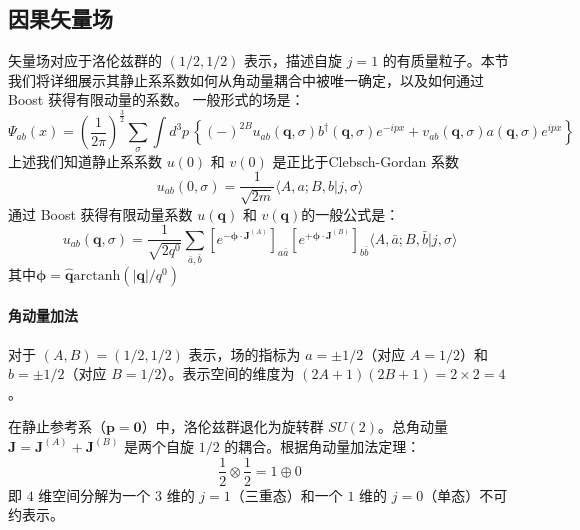 \subsection{因果矢量场 }
矢量场对应于洛伦兹群的 $(1/2,1/2)$ 表示，描述自旋 $j=1$ 的有质量粒子。本节我们将详细展示其静止系系数如何从角动量耦合中被唯一确定，以及如何通过 Boost 获得有限动量的系数。
一般形式的场是：
\begin{equation}
    \Psi_{ab}(x) =(\frac{1}{2\pi})^\frac{3}{2}\sum_{\sigma}\int d^3p \, \left\{(-)^{2B} u_{ab}(\boldsymbol{q},\sigma)b^\dagger(\boldsymbol{q},\sigma) e^{-ipx} + v_{ab}(\boldsymbol{q},\sigma) a(\boldsymbol{q},\sigma)e^{ipx} \right\}
\end{equation}
上述我们知道静止系系数 $u(0)$ 和 $v(0)$ 是正比于Clebsch-Gordan  系数 
\begin{equation}
    u_{ab}(0, \sigma) = \frac{1}{\sqrt{2m}} \langle A, a; B, b | j, \sigma \rangle
    \label{eq:u0_general_1/2}
\end{equation}
通过 Boost 获得有限动量系数 $u(\boldsymbol{q})$ 和 $v(\boldsymbol{q})$的一般公式是：
\begin{equation}
    u_{ab}(\boldsymbol{q}, \sigma) = \frac{1}{\sqrt{2q^0}} \sum_{\bar{a},\bar{b}} \left[e^{-\boldsymbol{\phi}\cdot\mathbf{J}^{(A)}}\right]_{a\bar{a}} \left[e^{+\boldsymbol{\phi}\cdot\mathbf{J}^{(B)}}\right]_{b\bar{b}} \langle A,\bar{a}; B,\bar{b} | j, \sigma \rangle
    \label{eq:u_finite_general_1/2}
\end{equation}
其中$\boldsymbol{\phi} = \hat{\boldsymbol{q}} \text{arctanh}(|\boldsymbol{q}|/q^0)$
\vspace{0.5cm}
\begin{center}
    \large{}
\end{center}
\vspace{0.5cm}
\paragraph{角动量加法}
对于 $(A,B)=(1/2,1/2)$ 表示，场的指标为 $a=\pm 1/2$（对应 $A=1/2$）和 $b=\pm 1/2$（对应 $B=1/2$）。表示空间的维度为 $(2A+1)(2B+1)=2\times 2=4$。

在静止参考系（$\boldsymbol{p}=\mathbf{0}$）中，洛伦兹群退化为旋转群 $SU(2)$。总角动量 $\mathbf{J}=\mathbf{J}^{(A)}+\mathbf{J}^{(B)}$ 是两个自旋 $1/2$ 的耦合。根据角动量加法定理：
\begin{equation}
    \frac{1}{2}\otimes\frac{1}{2} = 1\oplus 0
\end{equation}
即 $4$ 维空间分解为一个 $3$ 维的 $j=1$（三重态）和一个 $1$ 维的 $j=0$（单态）不可约表示。

